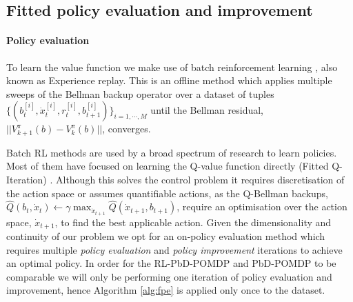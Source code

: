 \documentclass[final,3p,times,twocolumn]{elsarticle}
\newcommand{\B}{b}
\newcommand{\U}{\dot{x}}
\newcommand{\Ui}{\dot{x}^{[i]}}
\newcommand{\Bi}{b^{[i]}}
\begin{document}

\subsection{Fitted policy evaluation and improvement}\label{sec:fpe}

\paragraph{Policy evaluation}

To learn the value function we make use of batch reinforcement learning \cite{EGW05}, also known as Experience replay.
This is an offline method which applies multiple sweeps of the Bellman backup operator 
over a dataset of tuples $\{(\Bi_t,\Ui_t,r^{[i]}_{t},\Bi_{t+1})\}_{i=1,\cdots,M}$ until the Bellman residual,
$||V^{\pi}_{k+1}(\B) - V^{\pi}_{k}(\B)||$, converges. 

Batch RL methods are used by a broad spectrum of research to learn policies. 
Most of them have focused on learning the Q-value function directly (Fitted Q-Iteration) 
\cite{NIPS2008_3501,EGW05,Riedmiller2005}. Although this solves the control problem it requires discretisation 
of the action space or assumes quantifiable actions, as the 
Q-Bellman backups, $\hat{Q}(\B_t,\U_t) \leftarrow \gamma \max_{\U_{t+1}} \hat{Q}(\U_{t+1},\B_{t+1})$, 
require an optimisation over the action space, $\U_{t+1}$, to find the best applicable action. 
Given the dimensionality and continuity of our problem we opt for an on-policy evaluation method
which requires multiple \textit{policy evaluation} and \textit{policy improvement} iterations to achieve an optimal policy.
In order for the RL-PbD-POMDP and PbD-POMDP to be comparable we will only be performing one iteration of policy evaluation
and improvement, hence Algorithm \ref{alg:fpe} is applied only once to the dataset.
\end{document}

